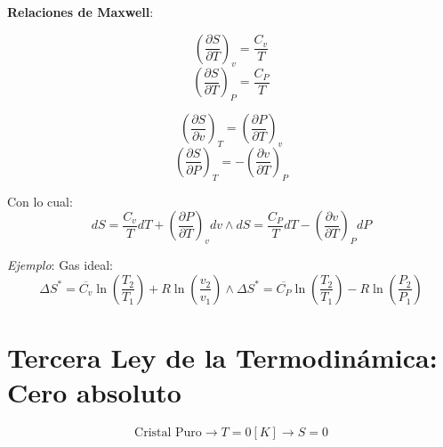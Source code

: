    \textbf{Relaciones de Maxwell}:
    \begin{multicols}{2}
        \begin{equation}
        \label{maxwel_1}
            \left ( \frac{\partial S}{\partial T} \right )_{v}=\frac{C_{v}}{T}
        \end{equation}
        \begin{equation}
        \label{maxwel_2}
            \left ( \frac{\partial S}{\partial T} \right )_{P}=\frac{C_{P}}{T}
        \end{equation}
        
        \begin{equation}
        \label{maxwel_3}
            \left ( \frac{\partial S}{\partial v} \right )_{T}=\left ( \frac{\partial P}{\partial T} \right )_{v}
        \end{equation}
        \begin{equation}
        \label{maxwel_4}
            \left ( \frac{\partial S}{\partial P} \right )_{T}=-\left ( \frac{\partial v}{\partial T} \right )_{P}
        \end{equation}
    \end{multicols}
    Con lo cual:
    \begin{equation}
    \label{delta_entropia}
        dS=\frac{C_{v}}{T}dT+\left ( \frac{\partial P}{\partial T} \right )_{v}dv \wedge dS=\frac{C_{P}}{T}dT-\left ( \frac{\partial v}{\partial T} \right )_{P}dP
    \end{equation}
    \begin{quote}
        \textit{}
    \end{quote}
    \textit{Ejemplo}: Gas ideal:
    \begin{equation}
    \label{gas_ideal_entropia}
        \Delta S^{*}=\overline{C_{v}}\ln(\frac{T_{2}}{T_{1}})+R\ln(\frac{v_{2}}{v_{1}}) \wedge \Delta S^{*}=\overline{C_{P}}\ln(\frac{T_{2}}{T_{1}})-R\ln(\frac{P_{2}}{P_{1}})
    \end{equation}

\section{Tercera Ley de la Termodinámica: Cero absoluto}

\[\text{Cristal Puro} \rightarrow T=0[K] \rightarrow S=0\]

\begin{quote}
    \textit{}
\end{quote}

